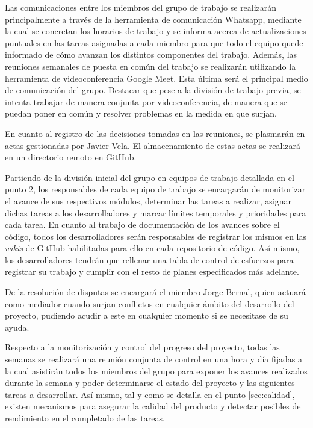 \documentclass{article}
\begin{document}
Las comunicaciones entre los miembros del grupo de trabajo se realizarán principalmente a través de la herramienta de comunicación Whatsapp, mediante la cual se concretan los horarios de trabajo y se informa acerca de actualizaciones puntuales en las tareas asignadas a cada miembro para que todo el equipo quede informado de cómo avanzan los distintos componentes del trabajo. Además, las reuniones semanales de puesta en común del trabajo se realizarán utilizando la herramienta de videoconferencia Google Meet. Esta última será el principal medio de comunicación del grupo. Destacar que pese a la división de trabajo previa, se intenta trabajar de manera conjunta por videoconferencia, de manera que se puedan poner en común y resolver problemas en la medida en que surjan.

En cuanto al registro de las decisiones tomadas en las reuniones, se plasmarán en actas gestionadas por Javier Vela. El almacenamiento de estas actas se realizará en un directorio remoto en GitHub.

Partiendo de la división inicial del grupo en equipos de trabajo detallada en el punto 2, los responsables de cada equipo de trabajo se encargarán de monitorizar el avance de sus respectivos módulos, determinar las tareas a realizar, asignar dichas tareas a los desarrolladores y marcar límites temporales y prioridades para cada tarea. En cuanto al trabajo de documentación de los avances sobre el código, todos los desarrolladores serán responsables de registrar los mismos en las \textit{wikis} de GitHub habilitadas para ello en cada repositorio de código. Así mismo, los desarrolladores tendrán que rellenar una tabla de control de esfuerzos para registrar su trabajo y cumplir con el resto de planes especificados más adelante.

De la resolución de disputas se encargará el miembro Jorge Bernal, quien actuará como mediador cuando surjan conflictos en cualquier ámbito del desarrollo del proyecto, pudiendo acudir a este en cualquier momento si se necesitase de su ayuda.

Respecto a la monitorización y control del progreso del proyecto, todas las semanas se realizará una reunión conjunta de control en una hora y día fijadas a la cual asistirán todos los miembros del grupo para exponer los avances realizados durante la semana y poder determinarse el estado del proyecto y las siguientes tareas a desarrollar. Así mismo, tal y como se detalla en el punto \ref{sec:calidad}, existen mecanismos para asegurar la calidad del producto y detectar posibles de rendimiento en el completado de las tareas.
\end{document}
